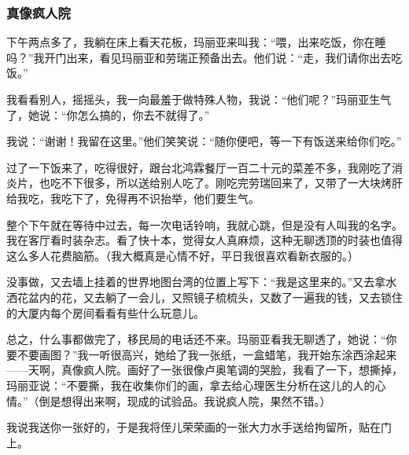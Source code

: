 \subsubsection*{真像疯人院}
\par 下午两点多了，我躺在床上看天花板，玛丽亚来叫我：“喂，出来吃饭，你在睡吗？”我开门出来，看见玛丽亚和劳瑞正预备出去。他们说：“走，我们请你出去吃饭。”
\par 我看看别人，摇摇头，我一向最羞于做特殊人物，我说：“他们呢？”玛丽亚生气了，她说：“你怎么搞的，你去不就得了。”
\par 我说：“谢谢！我留在这里。”他们笑笑说：“随你便吧，等一下有饭送来给你们吃。”
\par 过了一下饭来了，吃得很好，跟台北鸿霖餐厅一百二十元的菜差不多，我刚吃了消炎片，也吃不下很多，所以送给别人吃了。刚吃完劳瑞回来了，又带了一大块烤肝给我吃，我吃下了，免得再不识抬举，他们要生气。
\par 整个下午就在等待中过去，每一次电话铃响，我就心跳，但是没有人叫我的名字。我在客厅看时装杂志。看了快十本，觉得女人真麻烦，这种无聊透顶的时装也值得这么多人花费脑筋。（我大概真是心情不好，平日我很喜欢看新衣服的。）
\par 没事做，又去墙上挂着的世界地图台湾的位置上写下：“我是这里来的。”又去拿水洒花盆内的花，又去躺了一会儿，又照镜子梳梳头，又数了一遍我的钱，又去锁住的大厦内每个房间看看有些什么玩意儿。
\par 总之，什么事都做完了，移民局的电话还不来。玛丽亚看我无聊透了，她说：“你要不要画图？”我一听很高兴，她给了我一张纸，一盒蜡笔，我开始东涂西涂起来——天啊，真像疯人院。画好了一张很像卢奥笔调的哭脸，我看了一下，想撕掉，玛丽亚说：“不要撕，我在收集你们的画，拿去给心理医生分析在这儿的人的心情。”（倒是想得出来啊，现成的试验品。我说疯人院，果然不错。）
\par 我说我送你一张好的，于是我将侄儿荣荣画的一张大力水手送给拘留所，贴在门上。
